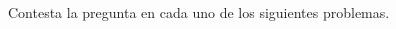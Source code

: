 \documentclass[12pt,addpoints]{evalua}
\begin{document}
\begin{questions}
\begin{multicols}{2}
      \end{multicols}

      \newpage
      \question[10] Contesta la pregunta en cada uno de los siguientes problemas.
      \begin{multicols}{2}
            \begin{parts}

\end{parts}
\end{multicols}
\end{questions}
\end{document}
